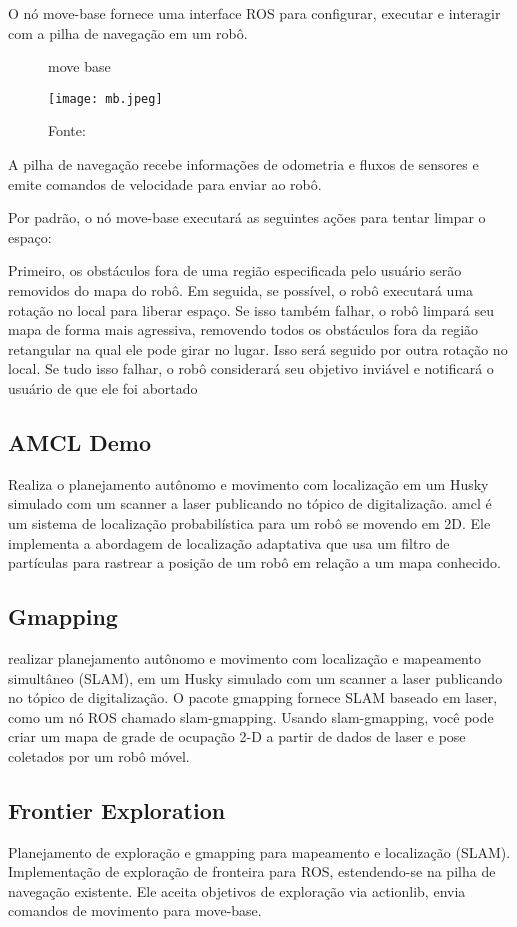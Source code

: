  O nó move-base fornece uma interface ROS para configurar, executar e interagir com a pilha de navegação em um robô.
 \begin{figure} [h!]	
   \centering
   \caption{move base}
   \texttt{[image: mb.jpeg]}
   \caption*{Fonte:}
   \label{fig:movebase}
\end{figure}

A pilha de navegação recebe informações de odometria e fluxos de sensores e emite comandos de velocidade para enviar ao robô.

Por padrão, o nó move-base executará as seguintes ações para tentar limpar o espaço:

Primeiro, os obstáculos fora de uma região especificada pelo usuário serão removidos do mapa do robô. Em seguida, se possível, o robô executará uma rotação no local para liberar espaço. Se isso também falhar, o robô limpará seu mapa de forma mais agressiva, removendo todos os obstáculos fora da região retangular na qual ele pode girar no lugar. Isso será seguido por outra rotação no local. Se tudo isso falhar, o robô considerará seu objetivo inviável e notificará o usuário de que ele foi abortado \cite{WikiROS}

\subsection{AMCL Demo}
Realiza o planejamento autônomo e movimento com localização em um Husky simulado com um scanner a laser publicando no tópico de digitalização.
amcl é um sistema de localização probabilística para um robô se movendo em 2D. Ele implementa a abordagem de localização adaptativa que usa um filtro de partículas para rastrear a posição de um robô em relação a um mapa conhecido. \cite{WikiROS}

\subsection{Gmapping}
realizar planejamento autônomo e movimento com localização e mapeamento simultâneo (SLAM), em um Husky simulado com um scanner a laser publicando no tópico de digitalização.
O pacote gmapping fornece SLAM baseado em laser, como um nó ROS chamado slam-gmapping. Usando slam-gmapping, você pode criar um mapa de grade de ocupação 2-D a partir de dados de laser e pose coletados por um robô móvel.\cite{WikiROS}

\subsection{Frontier Exploration}
Planejamento de exploração e gmapping para mapeamento e localização (SLAM).
Implementação de exploração de fronteira para ROS, estendendo-se na pilha de navegação existente. Ele aceita objetivos de exploração via actionlib, envia comandos de movimento para move-base.\cite{WikiROS}
